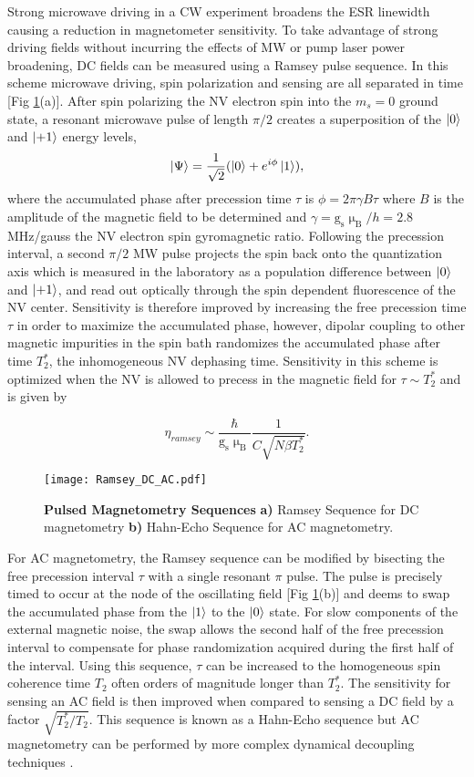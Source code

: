 Strong microwave driving in a CW experiment broadens the ESR linewidth causing a reduction in magnetometer sensitivity. To take advantage of strong driving fields without incurring the effects of MW or pump laser power broadening, DC fields can be measured using a Ramsey pulse sequence. In this scheme microwave driving, spin polarization and sensing are all separated in time [Fig \ref{Fig_two}(a)]. After spin polarizing the NV electron spin into the $m_s = 0$ ground state, a resonant microwave pulse of length $\pi/2$ creates a superposition of the $\ket{0}$ and $\ket{+1}$ energy levels,
$$\ket{\Psi} = \frac{1}{\sqrt{2}}(\ket{0} + e^{i\phi}\ket{1}),$$
where the accumulated phase after precession time $\tau$ is $\phi = 2\pi \gamma B \tau$ where $B$ is the amplitude of the magnetic field to be determined and $\gamma = \text{g}_\text{s} \upmu_\text{B} / h = 2.8$ MHz/gauss the NV electron spin gyromagnetic ratio. Following the precession interval, a second $\pi/2$ MW pulse projects the spin back onto the quantization axis which is measured in the laboratory as a population difference between $\ket{0}$ and $\ket{+1}$, and read out optically through the spin dependent fluorescence of the NV center. Sensitivity is therefore improved by increasing the free precession time $\tau$ in order to maximize the accumulated phase, however, dipolar coupling to other magnetic impurities in the spin bath randomizes the accumulated phase after time $T_2^*$, the inhomogeneous NV dephasing time. Sensitivity in this scheme is optimized when the NV is allowed to precess in the magnetic field for $\tau \sim T_2^*$ and is given by 

$$\eta_{ramsey} \sim \frac{\hbar}{\text{g}_\text{s} \upmu_{\text{B}}} \frac{1}{C\sqrt{N \beta T_2^*}}.$$ 

\begin{figure}[t!]
\centering
\texttt{[image: Ramsey\_DC\_AC.pdf]}  
\caption{\textbf{Pulsed Magnetometry Sequences} \textbf{a)} Ramsey Sequence for DC magnetometry \textbf{b)} Hahn-Echo Sequence for AC magnetometry.}
\label{Fig_two}
\end{figure}

For AC magnetometry, the Ramsey sequence can be modified by bisecting the free precession interval $\tau$ with a single resonant $\pi$ pulse. The pulse is precisely timed to occur at the node of the oscillating field [Fig \ref{Fig_two}(b)] and deems to swap the accumulated phase from the $\ket{1}$ to the $\ket{0}$ state. For slow components of the external magnetic noise, the swap allows the second half of the free precession interval to compensate for phase randomization acquired during the first half of the interval. Using this sequence, $\tau$ can be increased to the homogeneous spin coherence time $T_2$ often orders of magnitude longer than $T_2^*$. The sensitivity for sensing an AC field is then improved when compared to sensing a DC field by a factor $\sqrt{T_2^*/T_2}$. This sequence is known as a Hahn-Echo sequence but AC magnetometry can be performed by more complex dynamical decoupling techniques \cite{carr1954effects, meiboom1958modified}.


